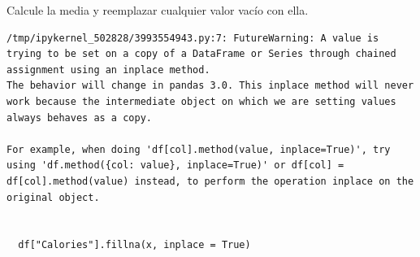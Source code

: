 \begin{code} Calcule la media y reemplazar cualquier valor vacío con ella.

\begin{Shaded}
\begin{Highlighting}[]

\OperatorTok{=}\NormalTok{)}

\OperatorTok{=}\NormalTok{ df[}\NormalTok{].mean()}

\NormalTok{df[}\NormalTok{].fillna(x, inplace }\OperatorTok{=} \NormalTok{)}
\end{Highlighting}
\end{Shaded}

\begin{verbatim}
/tmp/ipykernel_502828/3993554943.py:7: FutureWarning: A value is trying to be set on a copy of a DataFrame or Series through chained assignment using an inplace method.
The behavior will change in pandas 3.0. This inplace method will never work because the intermediate object on which we are setting values always behaves as a copy.

For example, when doing 'df[col].method(value, inplace=True)', try using 'df.method({col: value}, inplace=True)' or df[col] = df[col].method(value) instead, to perform the operation inplace on the original object.


  df["Calories"].fillna(x, inplace = True)

\end{verbatim}
\end{code}

